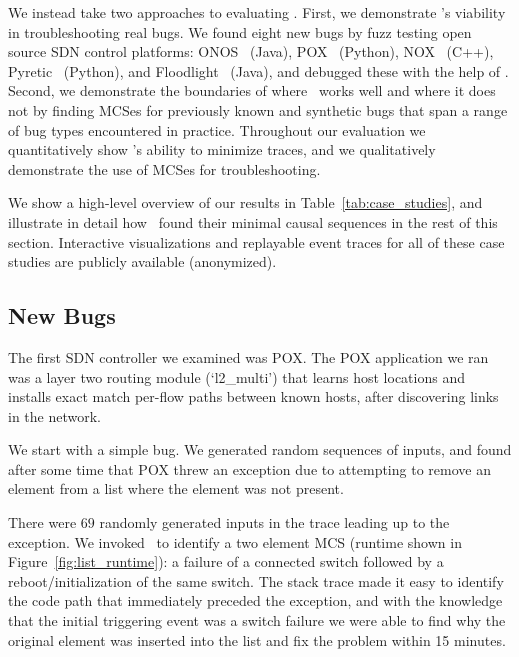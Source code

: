 We instead take two approaches to evaluating \projectname.
First, we demonstrate \projectname's viability in
troubleshooting real bugs. We found \num{eight} new bugs by fuzz testing open source
SDN control platforms:
ONOS~\cite{ONOS} (Java), POX~\cite{pox} (Python), NOX~\cite{nox} (C++),
Pyretic~\cite{frenetic} (Python), and Floodlight~\cite{bigswitch} (Java), and
debugged these with the help of \projectname. Second, we demonstrate the
boundaries of where \projectname~works well and where it does not by finding
MCSes for previously known and synthetic bugs that span a range of bug types encountered in
practice. Throughout our evaluation
we quantitatively show \projectname's ability to minimize traces, and we
qualitatively demonstrate the use of MCSes for troubleshooting.

We show a high-level overview
of our results in Table~\ref{tab:case_studies}, and
illustrate in detail how \projectname~found their minimal causal sequences
in the rest of this section. Interactive visualizations and replayable event traces
for all of these case studies are publicly available (anonymized).

\subsection{New Bugs}

 The first
SDN controller we examined was POX. %
The POX application we ran was a layer two routing module (`l2\_multi') that
learns host locations and installs exact match per-flow paths between known
hosts, after discovering links in the network. %

We start with a simple bug. %
We generated random sequences of
inputs, and found after some time that POX threw an exception due to
attempting to remove an element from a list where the element was not present.

There were $69$ randomly generated inputs in the trace leading up to the
exception. We invoked \projectname~to identify a two element MCS (runtime
shown in Figure~\ref{fig:list_runtime}):
a failure of a connected switch followed by a reboot/initialization of the same switch.
The stack trace made it easy to identify the code path that
immediately preceded the exception, and with
the knowledge that the initial triggering event was a switch failure we were able to
find why the original element was inserted into the list and fix the
problem within 15 minutes.

